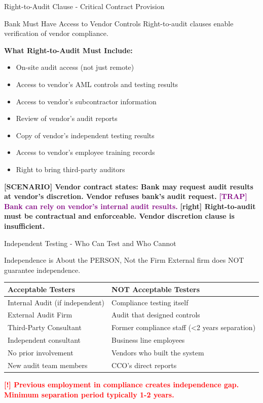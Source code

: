 \documentclass[11pt,a4paper]{beamer}
\newcommand{\redflag}[1]{\textcolor{red}{\textbf{[!] #1}}}
\newcommand{\trap}[1]{\textcolor{purple}{\textbf{[TRAP] #1}}}
\newcommand{\correct}[1]{\textcolor{green!50!black}{\textbf{[right] #1}}}
\newcommand{\scenario}[1]{\textcolor{blue!70!black}{\textbf{[SCENARIO] #1}}}
\begin{document}
\begin{frame}{Right-to-Audit Clause - Critical Contract Provision}
\begin{block}{Bank Must Have Access to Vendor Controls}
Right-to-audit clauses enable verification of vendor compliance.
\end{block}
\textbf{What Right-to-Audit Must Include:}
\begin{itemize}
\item On-site audit access (not just remote)
\item Access to vendor's AML controls and testing results
\item Access to vendor's subcontractor information
\item Review of vendor's audit reports
\item Copy of vendor's independent testing results
\item Access to vendor's employee training records
\item Right to bring third-party auditors
\end{itemize}
\scenario{Vendor contract states: Bank may request audit results at vendor's discretion. Vendor refuses bank's audit request.}
\trap{Bank can rely on vendor's internal audit results.}
\correct{Right-to-audit must be contractual and enforceable. Vendor discretion clause is insufficient.}
\end{frame}


\begin{frame}{Independent Testing - Who Can Test and Who Cannot}
\begin{block}{Independence is About the PERSON, Not the Firm}
External firm does NOT guarantee independence.
\end{block}
\begin{tabular}{p{}|p{}}
\hline
\rowcolor{lightgray}
\textbf{Acceptable Testers} & \textbf{NOT Acceptable Testers} \\
\hline
Internal Audit (if independent) & Compliance testing itself \\
External Audit Firm & Audit that designed controls \\
Third-Party Consultant & Former compliance staff (<2 years separation) \\
Independent consultant & Business line employees \\
No prior involvement & Vendors who built the system \\
New audit team members & CCO's direct reports \\
\hline
\end{tabular}
\redflag{Previous employment in compliance creates independence gap. Minimum separation period typically 1-2 years.}
\end{frame}
\end{document}
